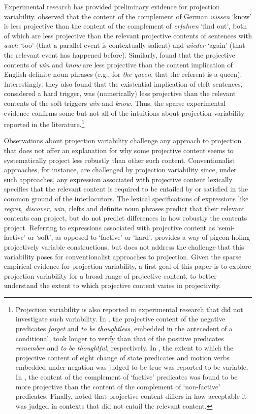 \documentclass[11pt,fleqn]{article}
\newcommand{\6}{\mbox{$[\hspace*{-.6mm}[$}}
\newcommand{\9}{\mbox{$]\hspace*{-.6mm}]$}}
\begin{document}
Experimental research has provided preliminary evidence for projection variability. \citet{xue-onea11} observed that the content of the complement of German {\em wissen} `know' is less projective than the content of the complement of {\em erfahren} `find out', both of which are less projective than the relevant projective contents of sentences with {\em auch} `too' (that a parallel event is contextually salient) and {\em wieder} `again' (that the relevant event has happened before). Similarly, \citet{smith-hall11} found that the projective contents of {\em win} and {\em know} are less projective than the content implication of English definite noun phrases (e.g., for {\em the queen}, that the referent is a queen). Interestingly, they also found that the existential implication of cleft sentences, considered a hard trigger, was (numerically) less projective than the relevant contents of the soft triggers {\em win} and {\em know}. Thus, the sparse experimental evidence confirms some but not all of the intuitions about projection variability reported in the literature.\footnote{Projection variability is also reported in experimental research that did not investigate such variability. In \citealt{just-clark1973}, the projective content of the negative predicates {\em forget} and {\em to be thoughtless}, embedded in the antecedent of a conditional, took longer to verify than that of the positive predicates {\em remember} and {\em to be thoughtful}, respectively. In \citealt{harris1974}, the extent to which the projective content of eight change of state predicates and motion verbs embedded under negation was judged to be true was reported to be variable. In \citealt{harris1974b}, the content of the complement of `factive' predicates was found to be more projective than the content of the complement of `non-factive' predicates. Finally, \citet{tiemann-etal11} noted that projective content differs in how acceptable it was judged in contexts that did not entail the relevant content.}

Observations about projection variability challenge any approach to projection that does not offer an explanation for why some projective content seems to systematically project less robustly than other such content. Conventionalist approaches, for instance, are challenged by projection variability since, under such approaches, any expression associated with projective content lexically specifies that the relevant content is required to be entailed by or satisfied in the common ground of the interlocutors. The lexical specifications of expressions like {\em regret, discover, win}, clefts and definite noun phrases predict that their relevant contents can project, but do not predict differences in how robustly the contents project. Referring to expressions associated with projective content as `semi-factive' or `soft', as opposed to `factive' or `hard', provides a way of pigeon-holing projectively variable constructions, but does not address the challenge that this variability poses for conventionalist approaches to projection. Given the sparse empirical evidence for projection variability, a first goal of this paper is to explore projection variability for a broad range of projective content, to better understand the extent to which projective content varies in projectivity. 
\end{document}
